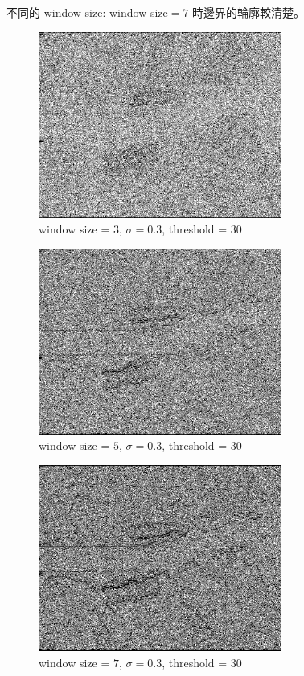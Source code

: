 \documentclass[conference]{IEEEtran}
\begin{document}
不同的 window size: window size$=7$ 時邊界的輪廓較清楚。

\begin{figure}[H]
\centerline{\includegraphics[width=8cm]{dentalXray01.png}}
\caption{window size = $3$, $\sigma=0.3$,  threshold = $30$}
\label{dentalXray01}
\end{figure}

\begin{figure}[H]
\centerline{\includegraphics[width=8cm]{dentalXray02.png}}
\caption{window size = $5$, $\sigma=0.3$,  threshold = $30$}
\label{dentalXray02}
\end{figure}

\begin{figure}[H]
\centerline{\includegraphics[width=8cm]{dentalXray03.png}}
\caption{window size = $7$, $\sigma=0.3$,  threshold = $30$}
\label{dentalXray03}
\end{figure}
\end{document}
